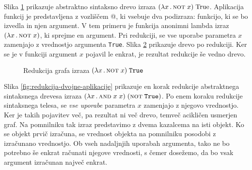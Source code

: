 Slika \ref{fig:redukcija-aplikacije-pred} prikazuje abstraktno sintaksno drevo izraza $(\lambda x \, . \, \textsc{not} \; x) \; \text{True}$. Aplikacija funkcij je predstavljena z vozliščem @, ki vsebuje dva podizraza: funkcijo, ki se bo izvedla in njen argument. V tem primeru je funkcija anonimni lambda izraz $(\lambda x \, . \, \textsc{not} \; x)$, ki sprejme en argument. Pri redukciji, se vse uporabe parametra $x$ zamenjajo z vrednostjo argumenta \texttt{True}. Slika \ref{fig:redukcija-aplikacije-po} prikazuje drevo po redukciji. Ker se je v funkciji argument $x$ pojavil le enkrat, je rezultat redukcije še vedno drevo.

\begin{figure*}[ht]
	\centering
	\begin{subfigure}[b]{0.45\textwidth}
		\centering
		\label{fig:redukcija-aplikacije-pred}
	\end{subfigure}%
	\hfill
	\begin{subfigure}[b]{0.45\textwidth}
		\centering
		\label{fig:redukcija-aplikacije-po}
	\end{subfigure}
	\caption{Redukcija grafa izraza $(\lambda x \, . \, \textsc{not} \; x) \; \texttt{True}$}
	\label{fig:redukcija-aplikacije}
\end{figure*}

Slika \ref{fig:redukcija-dvojne-aplikacije} prikazuje en korak redukcije abstraktnega sintaksnega drevesa izraza $(\lambda x \, . \, \textsc{and} \; x \; x) \; (\textsc{not} \; \texttt{True})$. Po enem koraku redukcije sintaksnega telesa, se \textit{vse uporabe} parametra $x$ zamenjajo z njegovo vrednostjo. Ker je takih pojavitev več, pa rezultat ni več drevo, temveč acikličen usmerjen graf. Na pomnilniku tak izraz predstavimo z dvema kazalcema na isti objekt. Ko se objekt prvič izračuna, se vrednost objekta na pomnilniku posodobi z izračunano vrednostjo. Ob vseh nadaljnjih uporabah argumenta, tako ne bo potrebno še enkrat računati njegove vrednosti, s čemer dosežemo, da bo vsak argument izračunan največ enkrat. 

